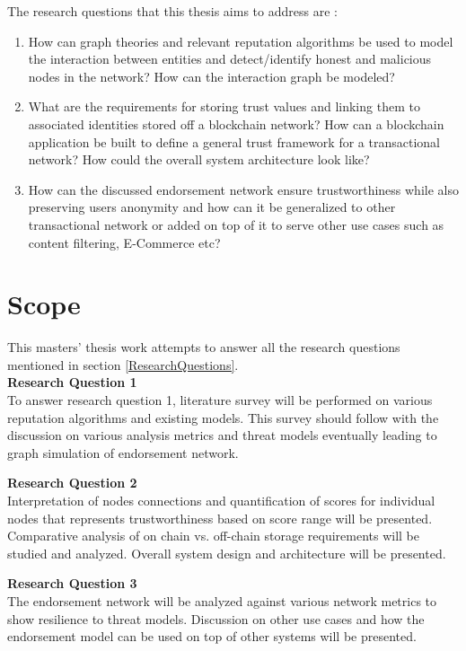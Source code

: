 The research questions that this thesis aims to address are : 
\begin{enumerate}
		\item How can graph theories and relevant reputation algorithms be used
			to model the interaction between entities and detect/identify
			honest and malicious nodes in the network? How can the interaction
			graph be modeled? \label{question1}
		\item What are the requirements for storing trust values and linking
			them to associated identities stored off a blockchain network? How
			can a blockchain application be built to define a general trust
			framework for a transactional network? How could the overall system
			architecture look like? \label{question2} 
		\item How can the discussed endorsement network ensure trustworthiness
			while also preserving users anonymity and how can it be generalized
			to other transactional network or added on top of it to serve other
			use cases such as content filtering, E-Commerce
			etc?\label{question3} 
\end{enumerate}

\section{Scope} 
This masters' thesis work attempts to answer all the research questions mentioned
in section \ref{ResearchQuestions}. \\
\textbf{Research Question 1}\\
To answer research question 1, literature survey will be performed on various
reputation algorithms and existing models. This survey should follow with the
discussion on various analysis metrics and threat models eventually leading to
graph simulation of endorsement network.  

\textbf{Research Question 2 } \\
Interpretation of nodes connections and quantification of scores for individual
nodes that represents trustworthiness based on score range will be presented.
Comparative analysis of on chain vs. off-chain storage requirements will be
studied and analyzed. Overall system design and architecture will be presented. 

\textbf{Research Question 3} \\
The endorsement network will be analyzed against various network metrics to
show resilience to threat models. Discussion on other use cases and how the
endorsement model can be used on top of other systems will be presented.

